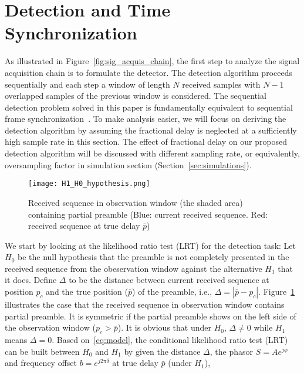 \section{Detection and Time Synchronization}
\label{sec:detection}

As illustrated in Figure~\ref{fig:sig_acquis_chain}, the first step to analyze
the signal acquisition chain is to formulate the detector.
The detection algorithm proceeds sequentially and each step a window of length $N$ received samples with 
$N{-}1$ overlapped samples of the previous window is considered. The sequential detection problem solved 
in this paper is fundamentally equivalent to sequential frame synchronization~\cite{Massey_72,Lui_Tan_86,Scholtz_80}.
To make analysis easier, we will focus on deriving the detection algorithm   
by assuming the fractional delay is neglected at a sufficiently high sample rate in this section.
The effect of fractional delay on our proposed detection algorithm will be discussed with different sampling rate, or equivalently, 
oversampling factor in simulation section (Section~\ref{sec:simulations}). 

\begin{figure}[t]
  \centerline{\texttt{[image: H1\_H0\_hypothesis.png]}}
  \caption{Received sequence in observation window (the shaded area) containing partial preamble (Blue: current received sequence. Red: received sequence at true delay $\bar{p}$)}
  \label{fig:H1_H0_hypothesis}
  \end{figure}

We start by looking at the likelihood ratio test (LRT) for the detection task:
Let $H_0$ be the null hypothesis that the preamble is not completely presented in the received sequence from the obeservation window 
against the alternative $H_1$ that it does. 
Define $\Delta$ to be the distance between current received sequence at position $p_c$ and the true position ($\bar{p}$) of the preamble, 
i.e., $\Delta=|\bar{p}-p_c|$. Figure~\ref{fig:H1_H0_hypothesis} illustrates the case that the received sequence in observation window contains partial preamble.
It is symmetric if the partial preamble shows on the left side of the observation window ($p_c>\bar{p}$).
It is obvious that under $H_0$, $\Delta \neq 0$ while $H_1$ means $\Delta=0$. 
Based on~\eqref{eq:model}, the conditional likelihood ratio test (LRT) can be built 
between $H_0$ and $H_1$ by given the distance $\Delta$, the phasor $S{=}Ae^{j\phi}$ and frequency offset $b{=}e^{j2\pi \delta}$
at true delay $\bar{p}$ (under $H_1$),

